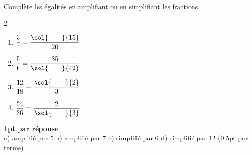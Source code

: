 
\question[4]
Complète les égalités en amplifiant ou en simplifiant les fractions.

\vspace{10pt}
\setlength{\columnsep}{50pt}
\begin{multicols}{2}
\begin{enumerate}[leftmargin=*,align=parleft, label=\alph*), itemsep=30pt]
\item $\dfrac{3}{4} = \dfrac{\sol{\hspace{20pt}}{15}}{20}$
\item $\dfrac{5}{6} = \dfrac{35}{\sol{\hspace{20pt}}{42}}$
\item $\dfrac{12}{18} = \dfrac{\sol{\hspace{20pt}}{2}}{3}$
\item $\dfrac{24}{36} = \dfrac{2}{\sol{\hspace{20pt}}{3}}$ 
\end{enumerate}
\end{multicols}
\setlength{\columnsep}{10pt}

\begin{solution}[0pt]
\textbf{1pt par réponse}\\[4pt]
a) amplifié par $5$ \quad b) amplifié par $7$ \quad c) simplifié par $6$ \quad d) simplifié par $12$ (0.5pt par terme)
\end{solution}